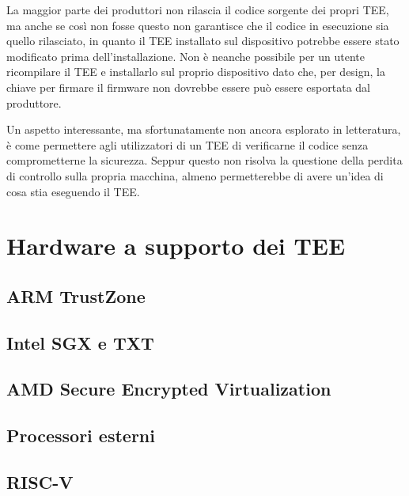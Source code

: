 \documentclass[12pt,italian]{report}
\begin{document}
La maggior parte dei produttori non rilascia il codice sorgente dei propri TEE,
ma anche se così non fosse questo non garantisce che il codice in esecuzione
sia quello rilasciato, in quanto il TEE installato sul dispositivo potrebbe
essere stato modificato prima dell'installazione.
Non è neanche possibile per un utente ricompilare il TEE e installarlo
sul proprio dispositivo dato che, per design, la chiave per firmare il firmware
non dovrebbe essere può essere esportata dal produttore.

Un aspetto interessante, ma sfortunatamente non ancora esplorato in letteratura,
è come permettere agli utilizzatori di un TEE di verificarne il codice senza
comprometterne la sicurezza.
Seppur questo non risolva la questione della perdita di controllo sulla
propria macchina, almeno permetterebbe di avere un'idea di cosa stia eseguendo
il TEE.

\chapter{Hardware a supporto dei TEE}
\label{chap:hardware-supporto-tee}

\section{ARM TrustZone}
\label{sec:arm-trustzone}

\section{Intel SGX e TXT}
\label{sec:intel-sgx-txt}

\section{AMD Secure Encrypted Virtualization}
\label{sec:amd-sev}

\section{Processori esterni}
\label{sec:processori-esterni}

\section{RISC-V}
\label{sec:risc-v}
\end{document}
